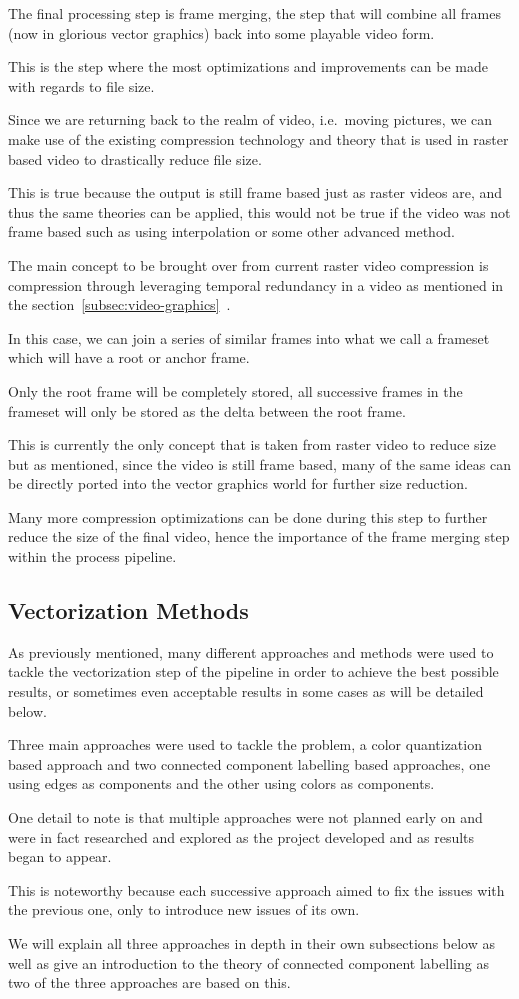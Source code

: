 \documentclass[12pt]{article}
\newcommand{\sentence}{} %
\newcommand{\fullref}[1]{\ref{#1}~\nameref{#1}}
\begin{document}
    \tab
    The final processing step is frame merging, the step that will combine all frames (now in glorious vector
    graphics) back into some playable video form.
    \sentence
    This is the step where the most optimizations and improvements can be made with regards to file size.
    \sentence
    Since we are returning back to the realm of video, i.e.\ moving pictures, we can make use of the existing
    compression technology and theory that is used in raster based video to drastically reduce file size.
    \sentence
    This is true because the output is still frame based just as raster videos are, and thus the same theories can be
    applied, this would not be true if the video was not frame based such as using interpolation or some other
    advanced method.
    \sentence
    The main concept to be brought over from current raster video compression is compression through leveraging
    temporal redundancy in a video as mentioned in the section~\fullref{subsec:video-graphics}.
    \sentence
    In this case, we can join a series of similar frames into what we call a frameset which will have a root
    or anchor frame.
    \sentence
    Only the root frame will be completely stored, all successive frames in the frameset will only be stored as the
    delta between the root frame.
    \sentence
    This is currently the only concept that is taken from raster video to reduce size but as mentioned, since the
    video is still frame based, many of the same ideas can be directly ported into the vector graphics world for
    further size reduction.
    \sentence
    Many more compression optimizations can be done during this step to further reduce the size of the final
    video, hence the importance of the frame merging step within the process pipeline.


    \subsection{Vectorization Methods}\label{subsec:vectorization-methods}

    \tab
    As previously mentioned, many different approaches and methods were used to tackle the vectorization step of the
    pipeline in order to achieve the best possible results, or sometimes even acceptable results in some cases as
    will be detailed below.
    \sentence
    Three main approaches were used to tackle the problem, a color quantization based approach and two connected
    component labelling based approaches, one using edges as components and the other using colors as components.
    \sentence
    One detail to note is that multiple approaches were not planned early on and were in fact researched and explored
    as the project developed and as results began to appear.
    \sentence
    This is noteworthy because each successive approach aimed to fix the issues with the previous one, only to
    introduce new issues of its own.
    \sentence
    We will explain all three approaches in depth in their own subsections below as well as give an introduction to
    the theory of connected component labelling as two of the three approaches are based on this.
\end{document}
